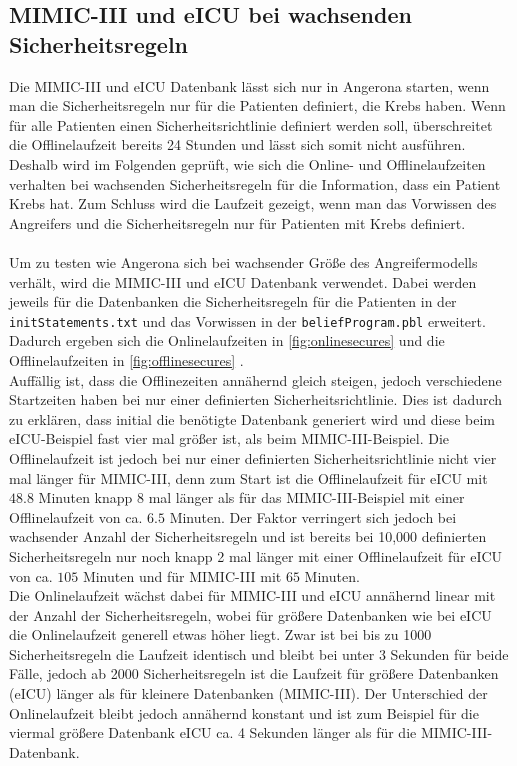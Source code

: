 \documentclass[german,version-2020-11]{uzl-thesis}
\begin{document}
\subsection{MIMIC-III und eICU bei wachsenden Sicherheitsregeln}
Die MIMIC-III und eICU Datenbank lässt sich nur in Angerona starten, wenn man die Sicherheitsregeln nur für die Patienten definiert, die Krebs haben. Wenn für alle Patienten einen Sicherheitsrichtlinie definiert werden soll, überschreitet die Offlinelaufzeit bereits 24 Stunden und lässt sich somit nicht ausführen. Deshalb wird im Folgenden geprüft, wie sich die Online- und Offlinelaufzeiten verhalten bei wachsenden Sicherheitsregeln für die Information, dass ein Patient Krebs hat. Zum Schluss wird die Laufzeit gezeigt, wenn man das Vorwissen des Angreifers und die Sicherheitsregeln nur für Patienten mit Krebs definiert. \\ \\
Um zu testen wie Angerona sich bei wachsender Größe des Angreifermodells verhält, wird die MIMIC-III und eICU Datenbank verwendet. Dabei werden jeweils für die Datenbanken die Sicherheitsregeln für die Patienten in der \texttt{initStatements.txt} und das Vorwissen in der \texttt{beliefProgram.pbl} erweitert. Dadurch ergeben sich die Onlinelaufzeiten in \autoref{fig:onlinesecures} und die Offlinelaufzeiten in \autoref{fig:offlinesecures} . \\ 
Auffällig ist, dass die Offlinezeiten annähernd gleich steigen, jedoch verschiedene Startzeiten haben bei nur einer definierten  Sicherheitsrichtlinie. Dies ist dadurch zu erklären, dass initial die benötigte Datenbank generiert wird und diese beim eICU-Beispiel fast vier mal größer ist, als beim MIMIC-III-Beispiel. Die Offlinelaufzeit ist jedoch bei nur einer definierten Sicherheitsrichtlinie nicht vier mal länger für MIMIC-III, denn zum Start ist die Offlinelaufzeit für eICU mit $48.8$ Minuten knapp 8 mal länger als für das MIMIC-III-Beispiel mit einer Offlinelaufzeit von ca. $6.5$ Minuten. Der Faktor verringert sich jedoch bei wachsender Anzahl der Sicherheitsregeln und ist bereits bei 10,000 definierten Sicherheitsregeln nur noch knapp 2 mal länger mit einer Offlinelaufzeit für eICU von ca. $105$ Minuten und für MIMIC-III mit $65$ Minuten. \\ 
Die Onlinelaufzeit wächst dabei für MIMIC-III und eICU annähernd linear mit der Anzahl der Sicherheitsregeln, wobei für größere Datenbanken wie bei eICU die Onlinelaufzeit generell etwas höher liegt. Zwar ist bei bis zu 1000 Sicherheitsregeln die Laufzeit identisch und bleibt bei unter 3 Sekunden für beide Fälle, jedoch ab 2000 Sicherheitsregeln ist die Laufzeit für größere Datenbanken (eICU) länger als für kleinere Datenbanken (MIMIC-III). Der Unterschied der Onlinelaufzeit bleibt jedoch annähernd konstant und ist zum Beispiel für die viermal größere Datenbank eICU ca. 4 Sekunden länger als für die MIMIC-III-Datenbank. 
\end{document}
